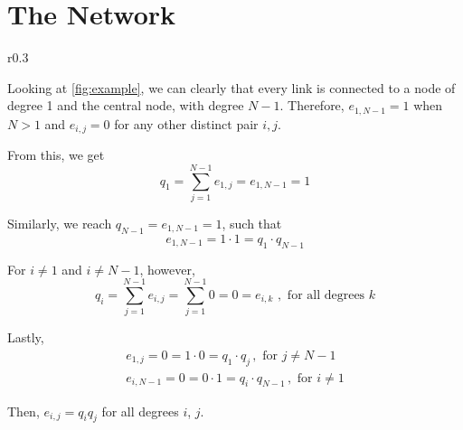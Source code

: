 \section{The Network}

\begin{wrapfigure}{r}{0.3\textwidth}
    \centering
    

    \caption{Star network with $N = 13$ nodes.}
    \label{fig:example}
\end{wrapfigure}

Looking at \cref{fig:example}, we can clearly that every link is connected to a node of degree 1 and the central node, with degree $N-1$. Therefore, $e_{1,N-1} = 1$ when $N > 1$ and $e_{i,j} = 0$ for any other distinct pair $i,j$.

From this, we get \[
    q_1 = \sum_{j = 1}^{N-1} e_{1,j} = e_{1,N-1} = 1
\]

Similarly, we reach $q_{N-1} = e_{1,N-1} = 1$, such that \[
    e_{1,N-1} = 1 \cdot 1 = q_1 \cdot q_{N-1}
\]

For $i \ne 1$ and $i \ne N-1$, however, \[
    q_i = \sum_{j = 1}^{N-1} e_{i,j} = \sum_{j = 1}^{N-1} 0 = 0 = e_{i,k}
    \,\,,\,\, \text{for all degrees $k$}
\]

Lastly,
\begin{align*}
    e_{1,j} = 0 = 1 \cdot 0 = q_1 \cdot q_j \,,\,\, \text{for $j \ne N-1$} \\
    e_{i,N-1} = 0 = 0 \cdot 1 = q_i \cdot q_{N-1} \,,\,\, \text{for $i \ne 1$}
\end{align*}

Then, $e_{i,j} = q_i q_j$ for all degrees $i$, $j$.
